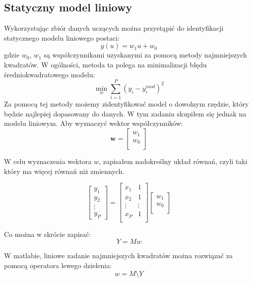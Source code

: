 \documentclass[a4paper,titlepage,11pt,floatssmall]{mwrep}
\begin{document}
\subsection{Statyczny model liniowy}
\indent Wykorzystując zbiór danych uczących można przystąpić do identyfikacji statycznego modelu liniowego postaci:
\begin{equation*}
y(u) = w_1u + w_0
\end{equation*}
gdzie $w_0$, $w_1$ są współczynnikami uzyskanymi za pomocą metody najmniejszych kwadratów. W ogólności, metoda ta polega na minimalizacji błędu średniokwadratowego modelu:
\begin{equation*}
\min_{w} \sum_{i=1}^{P} (y_i - y_i^{mod})^2
\end{equation*}
Za pomocą tej metody możemy zidentyfikować model o dowolnym rzędzie, który będzie najlepiej dopasowany do danych. W tym zadaniu skupiłem się jednak na modelu liniowym. Aby wyznaczyć wektor współczynników:
$$
\mathbf{w} =
\left[\begin{array}{c}
w_1 \\
w_0 \\
\end{array} \right]
$$
\newpage

W celu wyznaczenia wektora $w$, zapisałem nadokreślny układ równań, czyli taki który ma więcej równań niż zmiennych. 

$$
\left[\begin{array}{c}
y_1 \\
y_2 \\
\vdots \\
y_P
\end{array} \right] 
=
\left[ \begin{array}{cc}
x_1 & 1  \\
x_2 & 1 \\
\vdots & \vdots \\
x_P & 1\\
\end{array} \right]
\left[\begin{array}{c}
w_1 \\
w_0 \\
\end{array} \right]
$$

Co można w skrócie zapisać:
\begin{equation*}
Y = Mw
\end{equation*}

W matlabie, liniowe zadanie najmniejszych kwadratów można rozwiązać za pomocą operatora lewego dzielenia:
\begin{equation*}
w = M \setminus Y
\end{equation*}
\end{document}
